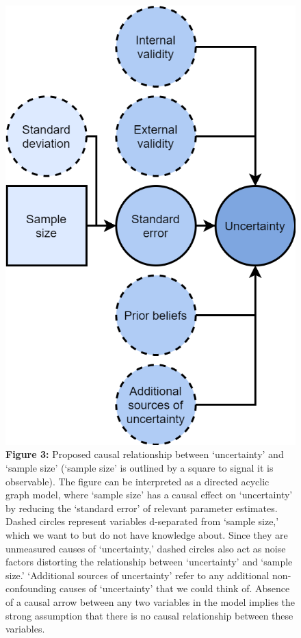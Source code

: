 \documentclass[
  english,
  jou,floatsintext]{apa6}
\begin{document}
\begin{figure}
\centering
\includegraphics{figure_3.png}
\caption{\textbf{Figure 3:} Proposed causal relationship between `uncertainty' and `sample size' (`sample size' is outlined by a square to signal it is observable). The figure can be interpreted as a directed acyclic graph model, where `sample size' has a causal effect on `uncertainty' by reducing the `standard error' of relevant parameter estimates. Dashed circles represent variables d-separated from `sample size,' which we want to but do not have knowledge about. Since they are unmeasured causes of `uncertainty,' dashed circles also act as noise factors distorting the relationship between `uncertainty' and `sample size.' `Additional sources of uncertainty' refer to any additional non-confounding causes of `uncertainty' that we could think of. Absence of a causal arrow between any two variables in the model implies the strong assumption that there is no causal relationship between these variables. \label{fig:3}}
\end{figure}
\end{document}
